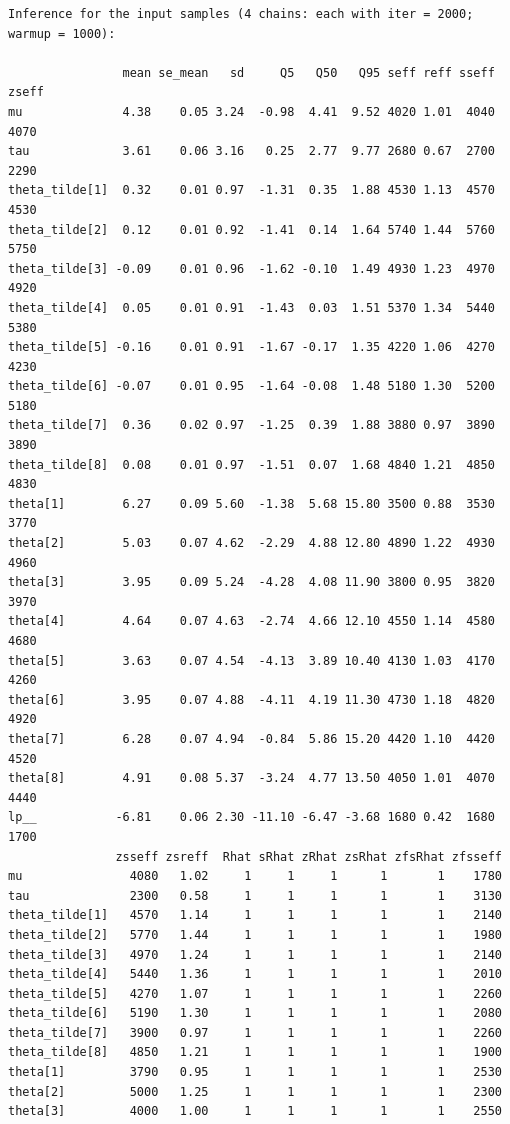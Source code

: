 \documentclass[american,]{article}
\begin{document}
\begin{verbatim}
Inference for the input samples (4 chains: each with iter = 2000; warmup = 1000):

                mean se_mean   sd     Q5   Q50   Q95 seff reff sseff zseff
mu              4.38    0.05 3.24  -0.98  4.41  9.52 4020 1.01  4040  4070
tau             3.61    0.06 3.16   0.25  2.77  9.77 2680 0.67  2700  2290
theta_tilde[1]  0.32    0.01 0.97  -1.31  0.35  1.88 4530 1.13  4570  4530
theta_tilde[2]  0.12    0.01 0.92  -1.41  0.14  1.64 5740 1.44  5760  5750
theta_tilde[3] -0.09    0.01 0.96  -1.62 -0.10  1.49 4930 1.23  4970  4920
theta_tilde[4]  0.05    0.01 0.91  -1.43  0.03  1.51 5370 1.34  5440  5380
theta_tilde[5] -0.16    0.01 0.91  -1.67 -0.17  1.35 4220 1.06  4270  4230
theta_tilde[6] -0.07    0.01 0.95  -1.64 -0.08  1.48 5180 1.30  5200  5180
theta_tilde[7]  0.36    0.02 0.97  -1.25  0.39  1.88 3880 0.97  3890  3890
theta_tilde[8]  0.08    0.01 0.97  -1.51  0.07  1.68 4840 1.21  4850  4830
theta[1]        6.27    0.09 5.60  -1.38  5.68 15.80 3500 0.88  3530  3770
theta[2]        5.03    0.07 4.62  -2.29  4.88 12.80 4890 1.22  4930  4960
theta[3]        3.95    0.09 5.24  -4.28  4.08 11.90 3800 0.95  3820  3970
theta[4]        4.64    0.07 4.63  -2.74  4.66 12.10 4550 1.14  4580  4680
theta[5]        3.63    0.07 4.54  -4.13  3.89 10.40 4130 1.03  4170  4260
theta[6]        3.95    0.07 4.88  -4.11  4.19 11.30 4730 1.18  4820  4920
theta[7]        6.28    0.07 4.94  -0.84  5.86 15.20 4420 1.10  4420  4520
theta[8]        4.91    0.08 5.37  -3.24  4.77 13.50 4050 1.01  4070  4440
lp__           -6.81    0.06 2.30 -11.10 -6.47 -3.68 1680 0.42  1680  1700
               zsseff zsreff  Rhat sRhat zRhat zsRhat zfsRhat zfsseff
mu               4080   1.02     1     1     1      1       1    1780
tau              2300   0.58     1     1     1      1       1    3130
theta_tilde[1]   4570   1.14     1     1     1      1       1    2140
theta_tilde[2]   5770   1.44     1     1     1      1       1    1980
theta_tilde[3]   4970   1.24     1     1     1      1       1    2140
theta_tilde[4]   5440   1.36     1     1     1      1       1    2010
theta_tilde[5]   4270   1.07     1     1     1      1       1    2260
theta_tilde[6]   5190   1.30     1     1     1      1       1    2080
theta_tilde[7]   3900   0.97     1     1     1      1       1    2260
theta_tilde[8]   4850   1.21     1     1     1      1       1    1900
theta[1]         3790   0.95     1     1     1      1       1    2530
theta[2]         5000   1.25     1     1     1      1       1    2300
theta[3]         4000   1.00     1     1     1      1       1    2550

\end{verbatim}
\end{document}
